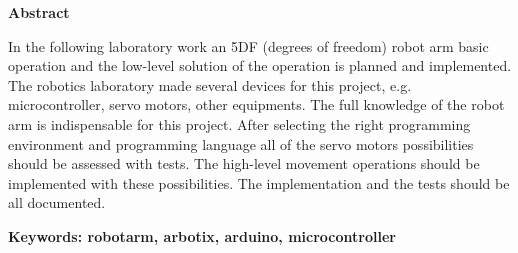 \thispagestyle{empty}

\begin{center}
	\Large
	\textbf{Abstract}
\end{center}
\vspace{5pt}

	In the following laboratory work an 5DF (degrees of freedom) robot arm basic operation and the low-level solution of the operation is planned and implemented. The robotics laboratory made several devices for this project, e.g. microcontroller, servo motors, other equipments. The full knowledge of the robot arm is indispensable for this project. After selecting the right programming environment and programming language all of the servo motors possibilities should be assessed with tests. The high-level movement operations should be implemented with these possibilities. The implementation and the tests should be all documented.

\textbf{Keywords: robotarm, arbotix, arduino, microcontroller} \textit{}
	
\newpage